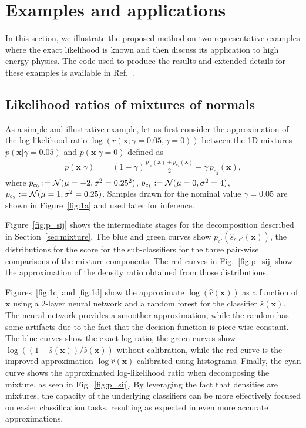 \documentclass[12pt]{article}
\numberwithin{equation}{section}
\theoremstyle{plain}
\begin{document}
\section{Examples and applications}
\label{sec:examples}

In this section, we illustrate the proposed method on two representative
examples where the exact likelihood is known and then discuss its application to high energy physics. The code used to produce the results and extended details for these examples is available in Ref.~\citep{carl}.%

\subsection{Likelihood ratios of mixtures of normals}

As a simple and illustrative example, let us first consider the approximation of
the log-likelihood ratio $\log \left( r(\mathbf{x};\gamma=0.05,\gamma=0) \right)$ between the 1D mixtures
$p(\mathbf{x}|\gamma=0.05)$ and $p(\mathbf{x}|\gamma=0)$ defined as
\begin{align}
p(\mathbf{x}|\gamma) &= (1-\gamma)\frac{p_{c_0}(\mathbf{x}) +  p_{c_1}(\mathbf{x})}{2}   + \gamma \, p_{c_2}(\mathbf{x}),
\end{align}
where $p_{c_0} := {\cal N}(\mu=-2, \sigma^2=0.25^2)$, $p_{c_1} := {\cal N}(\mu=0, \sigma^2=4)$,
$p_{c_2} := {\cal N}(\mu=1, \sigma^2=0.25)$. Samples drawn for the nominal value $\gamma=0.05$ are shown in
Figure~\ref{fig:1a} and used later for inference.

Figure~\ref{fig:p_sij} shows the intermediate stages for the decomposition described in Section~\ref{sec:mixture}.
The blue and green curves show $p_{c'}(\hat{s}_{c,c'}(\mathbf{x}))$,  the distributions for the score for the sub-classifiers for the three pair-wise comparisons of the mixture components. The red curves in Fig.~\ref{fig:p_sij} show the approximation of the density ratio obtained from those distributions.


Figures~\ref{fig:1c} and \ref{fig:1d} show the approximate $\log \left( \hat{r}(\mathbf{x}) \right)$ as a function of $\mathbf{x}$ using a
2-layer neural network and a random forest for the classifier $\hat{s}(\mathbf{x})$.
The neural network provides a smoother approximation, while the random has some artifacts due to the fact that the
decision function is piece-wise constant.
The blue curves show the exact log-ratio, the green curves show
$\log \left( (1-\hat s(\mathbf{x}))/\hat s(\mathbf{x}) \right)$
without calibration, while the red curve is the improved approximation $\log \hat{r}(\mathbf{x})$ calibrated
using histograms. Finally, the cyan curve shows the approximated log-likelihood ratio when decomposing the mixture, as
seen in Fig.~\ref{fig:p_sij}.  By leveraging the fact that densities are mixtures, the capacity
of the underlying classifiers can be more effectively focused on easier classification tasks,
resulting as expected in even more accurate approximations.
\end{document}
